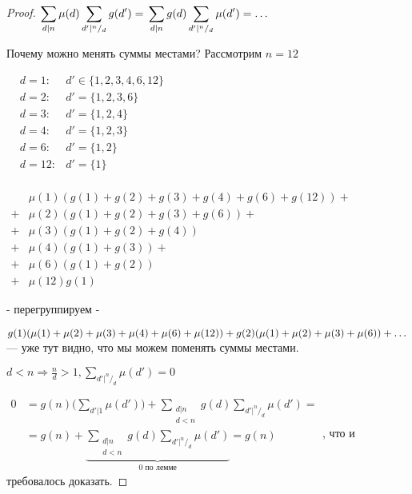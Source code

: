 \begin{proof}
$ \displaystyle
\sum \limits _{d|n} \mu(d) \sum \limits _{d'| ^n/_d} g(d') = \\
\sum \limits _{d|n} g(d) \sum \limits _{d'| ^n/_d} \mu(d') = \dots \\
$

Почему можно менять суммы местами? Рассмотрим $ n = 12 $ 

$
\begin{aligned}
&d = 1 :  &d' \in \{1,2,3,4,6,12\} \\
&d = 2 :  &d' = \{1,2,3,6\} \\
&d = 3 :  &d' = \{1,2,4\} \\ 
&d = 4 :  &d' = \{1,2,3\} \\
&d = 6 :  &d' = \{1,2\} \\
&d = 12: &d' = \{1\} \\
\end{aligned}
$

$
\begin{aligned}
&\mu(1)(g(1) + g(2) + g(3) + g(4) + g(6) + g(12)) + \\
+&\mu(2)(g(1) + g(2) + g(3) + g(6)) + \\
+&\mu(3) (g(1) + g(2) + g(4)) \\
+&\mu(4) (g(1) + g(3)) +\\
+&\mu(6)(g(1)+g(2)) \\
+&\mu(12)g(1)
\end{aligned}
$

- перегруппируем - 

$ 
g(1)(\mu(1) + \mu(2) + \mu(3) + \mu(4) + \mu(6) +   \mu(12) ) +\\
g(2)(\mu(1) + \mu(2) + \mu(3) + \mu(6)) + \dots
$  --- уже тут видно, что мы можем поменять суммы местами.


$
\displaystyle
d<n \Rightarrow \frac n d > 1,  \sum \limits _{d' | ^n/ _d} \mu(d') = 0
$

$
\displaystyle 
\begin{aligned}
0 &= g(n)\bigg(\sum\limits_{d'|1}\mu(d') \bigg) + \sum _{\substack {d|n \\ d < n}}g(d)\sum\limits_{d'|^n/_d} \mu(d') = \\
&= g(n) + \underbrace{\sum _{\substack {d|n \\ d < n}}g(d)\sum\limits_{d'|^n/_d} \mu(d') } _{ 0 \text{ по лемме} } = g(n)
\end{aligned}
$, что и требовалось доказать.



\end{proof}
 

